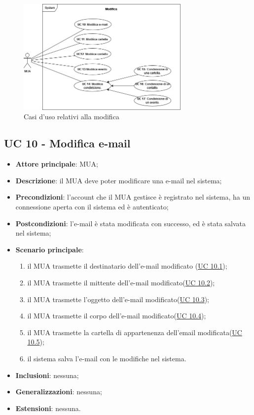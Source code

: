 \begin{figure}[H]
    \includegraphics[width=0.75\textwidth]{sections/uc_imgs/UC-modifica.png}
    \centering
    \caption{Casi d'uso relativi alla modifica}
\end{figure}

\subsection{UC 10 - Modifica e-mail} \label{sec:UC10}
    \begin{itemize}
        \item \textbf{Attore principale}: MUA;
        \item \textbf{Descrizione}: il MUA deve poter modificare una e-mail nel sistema;
        \item \textbf{Precondizioni}: l’account che il MUA gestisce è registrato nel sistema, ha un connessione aperta con il sistema ed è autenticato;
        \item \textbf{Postcondizioni}: l'e-mail è stata modificata con successo, ed è stata salvata nel sistema;
        \item \textbf{Scenario principale}:
            \begin{enumerate}
                \item il MUA trasmette il destinatario dell'e-mail modificato (\hyperref[sec:UC10.1]{UC 10.1});
                \item il MUA trasmette il mittente dell'e-mail modificato(\hyperref[sec:UC10.2]{UC 10.2});
                \item il MUA trasmette l'oggetto dell'e-mail modificato(\hyperref[sec:UC10.3]{UC 10.3});
                \item il MUA trasmette il corpo dell'e-mail modificato(\hyperref[sec:UC10.4]{UC 10.4});
                \item il MUA trasmette la cartella di appartenenza dell'email modificata(\hyperref[sec:UC10.5]{UC 10.5});
                \item il sistema salva l'e-mail con le modifiche nel sistema.
            \end{enumerate}
        \item \textbf{Inclusioni}: nessuna;
        \item \textbf{Generalizzazioni}: nessuna;
        \item \textbf{Estensioni}: nessuna.
    \end{itemize}

